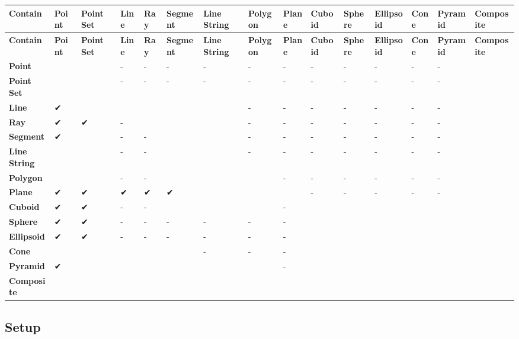 \begin{longtabu} spread 0pt [c]{*{15}{|X[-1]}|}
\hline
\rowcolor{\tableheadbgcolor}\textbf{ Contain }&\textbf{ Point }&\textbf{ Point Set }&\textbf{ Line }&\textbf{ Ray }&\textbf{ Segment }&\textbf{ Line String }&\textbf{ Polygon }&\textbf{ Plane }&\textbf{ Cuboid }&\textbf{ Sphere }&\textbf{ Ellipsoid }&\textbf{ Cone }&\textbf{ Pyramid }&\textbf{ Composite  }\\
\endfirsthead
\hline
\endfoot
\hline
\rowcolor{\tableheadbgcolor}\textbf{ Contain }&\textbf{ Point }&\textbf{ Point Set }&\textbf{ Line }&\textbf{ Ray }&\textbf{ Segment }&\textbf{ Line String }&\textbf{ Polygon }&\textbf{ Plane }&\textbf{ Cuboid }&\textbf{ Sphere }&\textbf{ Ellipsoid }&\textbf{ Cone }&\textbf{ Pyramid }&\textbf{ Composite  }\\
\endhead
{\bfseries Point} &&&-\/ &-\/ &-\/ &-\/ &-\/ &-\/ &-\/ &-\/ &-\/ &-\/ &-\/ &\\
{\bfseries Point Set} &&&-\/ &-\/ &-\/ &-\/ &-\/ &-\/ &-\/ &-\/ &-\/ &-\/ &-\/ &\\
{\bfseries Line} &✔ &&&&&&-\/ &-\/ &-\/ &-\/ &-\/ &-\/ &-\/ &\\
{\bfseries Ray} &✔ &✔ &-\/ &&&&-\/ &-\/ &-\/ &-\/ &-\/ &-\/ &-\/ &\\
{\bfseries Segment} &✔ &&-\/ &-\/ &&&-\/ &-\/ &-\/ &-\/ &-\/ &-\/ &-\/ &\\
{\bfseries Line String} &&&-\/ &-\/ &&&-\/ &-\/ &-\/ &-\/ &-\/ &-\/ &-\/ &\\
{\bfseries Polygon} &&&-\/ &-\/ &&&&-\/ &-\/ &-\/ &-\/ &-\/ &-\/ &\\
{\bfseries Plane} &✔ &✔ &✔ &✔ &✔ &&&&-\/ &-\/ &-\/ &-\/ &-\/ &\\
{\bfseries Cuboid} &✔ &✔ &-\/ &-\/ &&&&-\/ &&&&&&\\
{\bfseries Sphere} &✔ &✔ &-\/ &-\/ &-\/ &-\/ &-\/ &-\/ &&&&&&\\
{\bfseries Ellipsoid} &✔ &✔ &-\/ &-\/ &-\/ &-\/ &-\/ &-\/ &&&&&&\\
{\bfseries Cone} &&&&&&-\/ &-\/ &-\/ &&&&&&\\
{\bfseries Pyramid} &✔ &&&&&&&-\/ &&&&&&\\
{\bfseries Composite} &&&&&&&&&&&&&&\\
\end{longtabu}
\subsection*{Setup}

